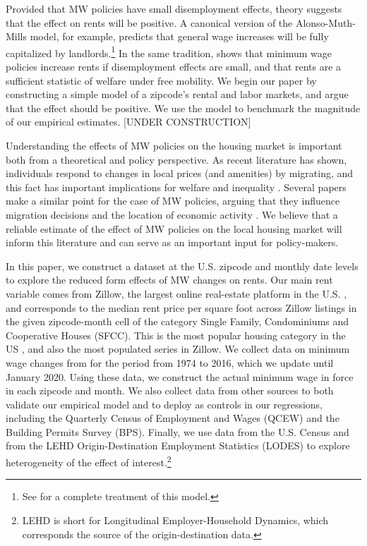 Provided that MW policies have small disemployment effects, theory suggests that the effect 
on rents will be positive. A canonical version of the Alonso-Muth-Mills model, for example, 
predicts that general wage increases will be fully capitalized by landlords.\footnote{See 
	\textcite{Brueckner1987} for a complete treatment of this model.} 
In the same tradition, \textcite{Yamagishi2020} shows that minimum wage policies increase 
rents if disemployment effects are small, and that rents are a sufficient statistic of welfare 
under free mobility. We begin our paper by constructing a simple model of a zipcode's rental 
and labor markets, and argue that the effect should be positive. We use the model to benchmark 
the magnitude of our empirical estimates. [UNDER CONSTRUCTION] 
 
Understanding the effects of MW policies on the housing market is important both from a 
theoretical and policy perspective. As recent literature has shown, individuals 
respond to changes in local prices (and amenities) by migrating, and this fact has important 
implications for welfare and inequality \parencite{Diamond2016, Couture2019}. Several papers 
make a similar point for the case of MW policies, arguing that they influence migration 
decisions and the location of economic activity \parencite{PerezPerez2018, Monras2019}. We 
believe that a reliable estimate of the effect of MW policies on the local housing market 
will inform this literature and can serve as an important input for policy-makers.
 
In this paper, we construct a dataset at the U.S. zipcode and monthly date levels to explore 
the reduced form effects of MW changes on rents. Our main rent variable comes from Zillow, 
the largest online real-estate platform in the U.S. \parencite{realestateagentpdx, investopedia}, 
and corresponds to the median rent price per square foot across Zillow listings 
in the given zipcode-month cell of the category Single Family, Condominiums and Cooperative 
Houses (SFCC). This is the most popular housing category in the US \parencite{fernald2020americas}, 
and also the most populated series in Zillow. We collect data on minimum wage changes from 
\textcite{VaghulZipperer2016} for the period from 1974 to 2016, which we update until January 
2020. Using these data, we construct the actual minimum wage in force in each zipcode and 
month. We also collect data from other sources to both validate our empirical model and to 
deploy as controls in our regressions, including the Quarterly Census of Employment and Wages 
(QCEW) and the Building Permits Survey (BPS). Finally, we use data from the U.S. Census and 
from the LEHD Origin-Destination Employment Statistics (LODES) to explore heterogeneity of 
the effect of interest.\footnote{LEHD is short for Longitudinal Employer-Household Dynamics, 
	which corresponds the source of the origin-destination data.}

